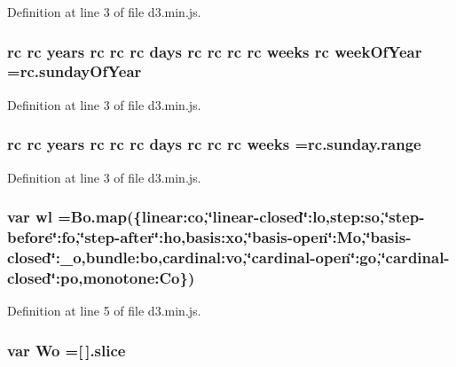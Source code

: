 Definition at line 3 of file d3.\+min.\+js.

\subsubsection[{week\+Of\+Year}]{ {\bf rc} {\bf rc} {\bf years} {\bf rc} {\bf rc} {\bf rc} {\bf days} {\bf rc} {\bf rc} {\bf rc} {\bf rc} {\bf weeks} {\bf rc} week\+Of\+Year =rc.\+sunday\+Of\+Year}\label{d3_8min_8js_ae335d9e197c87ca77a85ce62358d20f9}


Definition at line 3 of file d3.\+min.\+js.

\subsubsection[{weeks}]{ {\bf rc} {\bf rc} {\bf years} {\bf rc} {\bf rc} {\bf rc} {\bf days} {\bf rc} {\bf rc} {\bf rc} weeks ={\bf rc.\+sunday.\+range}}\label{d3_8min_8js_afb497c7543324c433ddda3cdc7e197b7}


Definition at line 3 of file d3.\+min.\+js.

\subsubsection[{wl}]{\setlength{\rightskip}{0pt plus 5cm}var wl ={\bf Bo.\+map}(\{linear\+:co,\char`\"{}linear-\/closed\char`\"{}\+:lo,step\+:so,\char`\"{}step-\/before\char`\"{}\+:fo,\char`\"{}step-\/after\char`\"{}\+:ho,basis\+:xo,\char`\"{}basis-\/open\char`\"{}\+:Mo,\char`\"{}basis-\/closed\char`\"{}\+:\+\_\+o,bundle\+:bo,cardinal\+:vo,\char`\"{}cardinal-\/open\char`\"{}\+:go,\char`\"{}cardinal-\/closed\char`\"{}\+:po,monotone\+:\+Co\})}\label{d3_8min_8js_a4c54bf544b31c9b214e29e6786b89b36}


Definition at line 5 of file d3.\+min.\+js.

\subsubsection[{Wo}]{\setlength{\rightskip}{0pt plus 5cm}var Wo =[$\,$].slice}\label{d3_8min_8js_a4285f55b23fc70ed4225546c070ca3c3}


